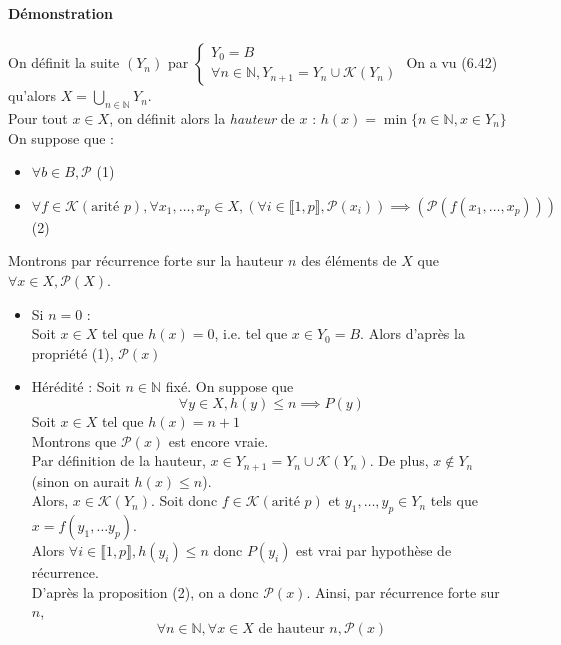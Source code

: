\documentclass{article}
\newcommand{\notion}[1]{\textcolor{vert_fonce}{\textit{#1}}}
\newenvironment{demonstration}
{
    \begin{boite_demonstration}
    \textbf{\textcolor{rouge_fonce}{Démonstration}}\\ \\
}
{
    \end{boite_demonstration}
    \vspace{15pt}
}
\begin{document}
\begin{adjustwidth}{-3cm}{-3cm}
\begin{demonstration}
    On définit la suite $(Y_n)$ par $\begin{cases}
        Y_0 =  B \\
        \forall n \in \mathbb{N}, Y_{n+1} = Y_n \cup \mathcal{K}(Y_n)
    \end{cases}$
    On a vu (6.42) qu'alors $X = \bigcup_{n \in \mathbb{N}}Y_n$. \\ Pour tout $x \in X$, on définit alors la \notion{hauteur} de $x$ : $h(x) = \min \{n \in \mathbb{N}, x \in Y_n\}$
    On suppose que : \begin{itemize}
        \item $\forall b \in B, \mathcal{P}$ (1)
        \item $\forall f \in \mathcal{K} (\text{arité }p), \forall x_1,\ldots, x_p \in X, (\forall i \in \llbracket 1,p \rrbracket, \mathcal{P}(x_i)) \implies (\mathcal{P}(f(x_1,\ldots,x_p)))$ (2)
    \end{itemize}
    Montrons par récurrence forte sur la hauteur $n$ des éléments de $X$ que $\forall x \in X, \mathcal{P}(X)$.
    \begin{itemize}
        \item Si $n = 0$ : \\Soit $x \in X$ tel que $h(x) = 0$, i.e. tel que $x \in Y_0 = B$. Alors d'après la propriété (1), $\mathcal{P}(x)$
        \item Hérédité : Soit $n \in \mathbb{N}$ fixé. On suppose que $$\forall y \in X, h(y) \leq n \implies P(y)$$ Soit $x \in X$ tel que $h(x) = n+1$ \\ Montrons que $\mathcal{P}(x)$ est encore vraie.\\Par définition de la hauteur, $x \in Y_{n+1} = Y_{n} \cup \mathcal{K}(Y_n)$. De plus, $x \notin Y_n$ (sinon on aurait $h(x) \leq n$).\\Alors, $x \in \mathcal{K}(Y_n)$. Soit donc $f \in \mathcal{K} (\text{arité }p)$ et $y_1, \ldots, y_p \in Y_n$ tels que $x = f(y_1,\ldots y_p)$.\\ Alors $\forall i \in \llbracket 1,p \rrbracket, h(y_i) \leq n$ donc $P(y_i)$ est vrai par hypothèse de récurrence.\\D'après la proposition (2), on a donc $\mathcal{P}(x)$. Ainsi, par récurrence forte sur $n$, $$\forall n \in \mathbb{N}, \forall x \in X \text{ de hauteur } n, \mathcal{P}(x)$$
    \end{itemize}
\end{demonstration}

\end{adjustwidth}
\end{document}
